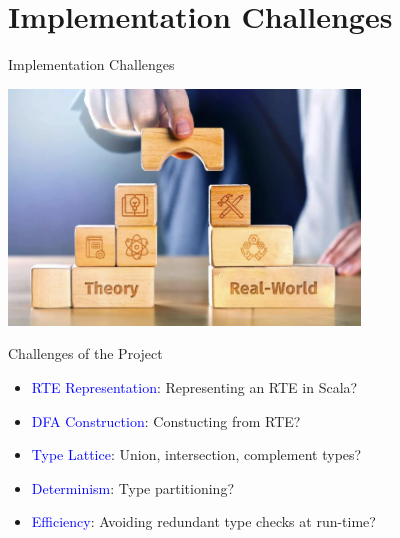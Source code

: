 \section{Implementation Challenges}

{  
  \begin{frame}{Implementation Challenges}
      
  \centering
  \includegraphics[width=0.7\textwidth]{theoretic-challenge.png}
\end{frame}
}

\begin{frame}{Challenges of the Project}
  \begin{itemize}
  \item {}\textcolor{blue}{RTE Representation}:   Representing an RTE in Scala?
  \item {}\textcolor{blue}{DFA Construction}:  Constucting from RTE?
  \item {}\textcolor{blue}{Type Lattice}: Union, intersection, complement types?
  \item {}\textcolor{blue}{Determinism}: Type partitioning?
  \item {}\textcolor{blue}{Efficiency}:  Avoiding redundant type checks at run-time?
  \end{itemize}
\end{frame}

